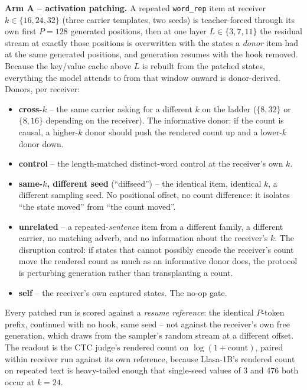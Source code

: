 \documentclass[11pt]{article}
\begin{document}
\textbf{Arm A -- activation patching.} A repeated \texttt{word\_rep} item at
receiver $k\in\{16,24,32\}$ (three carrier templates, two seeds) is teacher-forced
through its own first $P{=}128$ generated positions, then at one layer
$L\in\{3,7,11\}$ the residual stream at exactly those positions is overwritten
with the states a \emph{donor} item had at the same generated positions, and
generation resumes with the hook removed. Because the key/value cache above $L$
is rebuilt from the patched states, everything the model attends to from that
window onward is donor-derived. Donors, per receiver:

\begin{itemize}
\item \textbf{cross-$k$} -- the same carrier asking for a different $k$ on the
  ladder ($\{8,32\}$ or $\{8,16\}$ depending on the receiver). The informative
  donor: if the count is causal, a higher-$k$ donor should push the rendered
  count up and a lower-$k$ donor down.
\item \textbf{control} -- the length-matched distinct-word control at the
  receiver's own $k$.
\item \textbf{same-$k$, different seed} (``diffseed'') -- the identical item,
  identical $k$, a different sampling seed. No positional offset, no count
  difference: it isolates ``the state moved'' from ``the count moved''.
\item \textbf{unrelated} -- a repeated-\emph{sentence} item from a different
  family, a different carrier, no matching adverb, and no information about the
  receiver's $k$. The disruption control: if states that cannot possibly encode
  the receiver's count move the rendered count as much as an informative donor
  does, the protocol is perturbing generation rather than transplanting a count.
\item \textbf{self} -- the receiver's own captured states. The no-op gate.
\end{itemize}

\noindent Every patched run is scored against a \emph{resume reference}: the
identical $P$-token prefix, continued with no hook, same seed -- not against the
receiver's own free generation, which draws from the sampler's random stream at
a different offset. The readout is the CTC judge's rendered count on
$\log(1+\text{count})$, paired within receiver run against its own reference,
because Llasa-1B's rendered count on repeated text is heavy-tailed enough that
single-seed values of 3 and 476 both occur at $k{=}24$.
\end{document}
